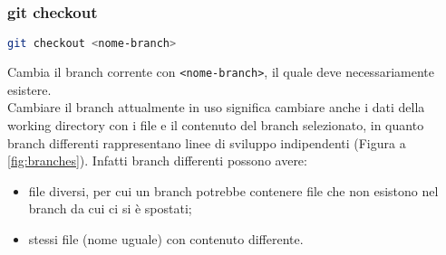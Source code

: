 \subsubsection{git checkout}
\begin{lstlisting}[language=bash]
	git checkout <nome-branch> 
\end{lstlisting}
Cambia il branch corrente con \texttt{<nome-branch>}, il quale deve necessariamente esistere.\\
Cambiare il branch attualmente in uso significa cambiare anche i dati della working directory con i file e il contenuto del branch selezionato, in quanto branch differenti rappresentano linee di sviluppo indipendenti (Figura a \ref{fig:branches}). Infatti branch differenti possono avere:
\begin{itemize}[noitemsep, topsep=3pt]
	\item file diversi, per cui un branch potrebbe contenere file che non esistono nel branch da cui ci si è spostati;
	\item stessi file (nome uguale) con contenuto differente.
\end{itemize}

